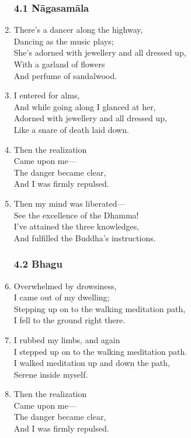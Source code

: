\documentclass[10pt, openany]{book}
\begin{document}
\begin{enumerate}
\subsubsection*{4.1 Nāgasamāla}

\item There’s a dancer along the highway,\\
Dancing as the music plays;\\
She’s adorned with jewellery and all dressed up,\\
With a garland of flowers \\
And perfume of sandalwood.

\item I entered for alms,\\
And while going along I glanced at her,\\
Adorned with jewellery and all dressed up,\\
Like a snare of death laid down.

\item Then the realization\\
Came upon me—\\
The danger became clear,\\
And I was firmly repulsed.

\item Then my mind was liberated—\\
See the excellence of the Dhamma!\\
I’ve attained the three knowledges,\\
And fulfilled the Buddha’s instructions.

\subsubsection*{4.2 Bhagu}

\item Overwhelmed by drowsiness,\\
I came out of my dwelling;\\
Stepping up on to the walking meditation path,\\
I fell to the ground right there.

\item I rubbed my limbs, and again\\
I stepped up on to the walking meditation path.\\
I walked meditation up and down the path,\\
Serene inside myself.

\item Then the realization\\
Came upon me—\\
The danger became clear,\\
And I was firmly repulsed.


\end{enumerate}
\end{document}
